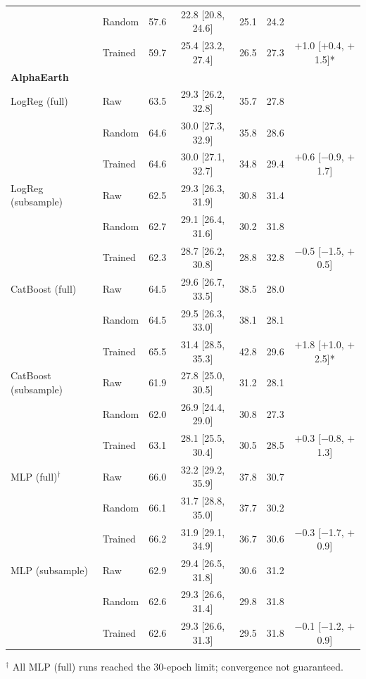 \begin{table}[H]
\begin{tabular}{llccccc}
     & Random & 57.6 & 22.8 [20.8, 24.6] & 25.1 & 24.2 &  \\
     & Trained & 59.7 & 25.4 [23.2, 27.4] & 26.5 & 27.3 & $+$1.0 [$+$0.4, $+$1.5]* \\
    \midrule
    \multicolumn{7}{l}{\textbf{AlphaEarth}} \\
    \midrule
    LogReg (full) & Raw & 63.5 & 29.3 [26.2, 32.8] & 35.7 & 27.8 &  \\
     & Random & 64.6 & 30.0 [27.3, 32.9] & 35.8 & 28.6 &  \\
     & Trained & 64.6 & 30.0 [27.1, 32.7] & 34.8 & 29.4 & $+$0.6 [$-$0.9, $+$1.7] \\
    \addlinespace
    LogReg (subsample) & Raw & 62.5 & 29.3 [26.3, 31.9] & 30.8 & 31.4 &  \\
     & Random & 62.7 & 29.1 [26.4, 31.6] & 30.2 & 31.8 &  \\
     & Trained & 62.3 & 28.7 [26.2, 30.8] & 28.8 & 32.8 & $-$0.5 [$-$1.5, $+$0.5] \\
    \addlinespace
    CatBoost (full) & Raw & 64.5 & 29.6 [26.7, 33.5] & 38.5 & 28.0 &  \\
     & Random & 64.5 & 29.5 [26.3, 33.0] & 38.1 & 28.1 &  \\
     & Trained & 65.5 & 31.4 [28.5, 35.3] & 42.8 & 29.6 & $+$1.8 [$+$1.0, $+$2.5]* \\
    \addlinespace
    CatBoost (subsample) & Raw & 61.9 & 27.8 [25.0, 30.5] & 31.2 & 28.1 &  \\
     & Random & 62.0 & 26.9 [24.4, 29.0] & 30.8 & 27.3 &  \\
     & Trained & 63.1 & 28.1 [25.5, 30.4] & 30.5 & 28.5 & $+$0.3 [$-$0.8, $+$1.3] \\
    \addlinespace
    MLP (full)$^\dagger$ & Raw & 66.0 & 32.2 [29.2, 35.9] & 37.8 & 30.7 &  \\
     & Random & 66.1 & 31.7 [28.8, 35.0] & 37.7 & 30.2 &  \\
     & Trained & 66.2 & 31.9 [29.1, 34.9] & 36.7 & 30.6 & $-$0.3 [$-$1.7, $+$0.9] \\
    \addlinespace
    MLP (subsample) & Raw & 62.9 & 29.4 [26.5, 31.8] & 30.6 & 31.2 &  \\
     & Random & 62.6 & 29.3 [26.6, 31.4] & 29.8 & 31.8 &  \\
     & Trained & 62.6 & 29.3 [26.6, 31.3] & 29.5 & 31.8 & $-$0.1 [$-$1.2, $+$0.9] \\
    \bottomrule
  \end{tabular}
  \par\smallskip\footnotesize $^\dagger$ All MLP (full) runs reached the 30-epoch limit; convergence not guaranteed.
\end{table}
